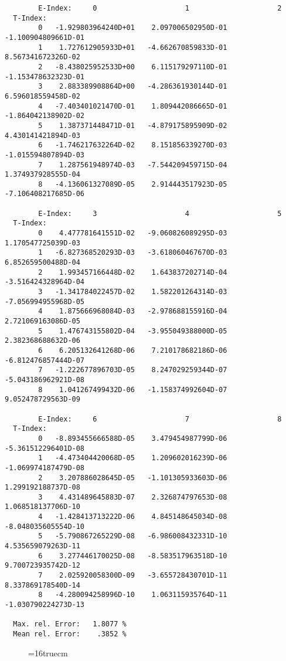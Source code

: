 \documentclass[12pt,dvipdfmx]{article}
\begin{document}
\begin{small}\begin{verbatim}
        E-Index:     0                     1                     2
  T-Index:
        0   -1.929803964240D+01    2.097006502950D-01   -1.100904809661D-01
        1    1.727612905933D+01   -4.662670859833D-01    8.567341672326D-02
        2   -8.438025952533D+00    6.115179297110D-01   -1.153478632323D-01
        3    2.883389908864D+00   -4.286361930144D-01    6.596018559458D-02
        4   -7.403401021470D-01    1.809442086665D-01   -1.864042138902D-02
        5    1.387371448471D-01   -4.879175895909D-02    4.430141421894D-03
        6   -1.746217632264D-02    8.151856339270D-03   -1.015594807894D-03
        7    1.287561948974D-03   -7.544209459715D-04    1.374937928555D-04
        8   -4.136061327089D-05    2.914443517923D-05   -7.106408217685D-06

        E-Index:     3                     4                     5
  T-Index:
        0    4.477781641551D-02   -9.060826089295D-03    1.170547725039D-03
        1   -6.827368520293D-03   -3.618060467670D-03    6.852659500488D-04
        2    1.993457166448D-02    1.643837202714D-04   -3.516424328964D-04
        3   -1.341784022457D-02    1.582201264314D-03   -7.056994955968D-05
        4    1.875666968084D-03   -2.978688155916D-04    2.721069163086D-05
        5    1.476743155802D-04   -3.955049388000D-05    2.382368688632D-06
        6    6.205132641268D-06    7.210178682186D-06   -6.812476857444D-07
        7   -1.222677896703D-05    8.247029259344D-07   -5.043186962921D-08
        8    1.041267499432D-06   -1.158374992604D-07    9.052478729563D-09

        E-Index:     6                     7                     8
  T-Index:
        0   -8.893455666588D-05    3.479454987799D-06   -5.361512296401D-08
        1   -4.473404420068D-05    1.209602016239D-06   -1.069974187479D-08
        2    3.207886028645D-05   -1.101305933603D-06    1.299192188737D-08
        3    4.431489645883D-07    2.326874797653D-08    1.068518137706D-10
        4   -1.428413713222D-06    4.845148645034D-08   -8.048035605554D-10
        5   -5.790867265229D-08   -6.986008432331D-10    4.535659079263D-11
        6    3.277446170025D-08   -8.583517963518D-10    9.700723935742D-12
        7    2.025920058300D-09   -3.655728430701D-11    8.337869178540D-14
        8   -4.280094258996D-10    1.063115935764D-11   -1.030790224273D-13

  Max. rel. Error:   1.8077 %
  Mean rel. Error:    .3852 %

\end{verbatim}\end{small}
\begin{figure} \label{h12_2.0a}
\epsfxsize=16truecm
\end{figure}
\end{document}
